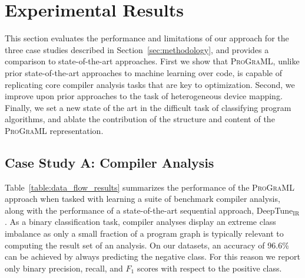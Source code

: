 \section{Experimental Results}

This section evaluates the performance and limitations of our approach
for the three case studies described in Section~\ref{sec:methodology},
and provides a comparison to state-of-the-art approaches. First we
show that \textsc{ProGraML}, unlike prior state-of-the-art approaches
to machine learning over code, is capable of replicating core compiler
analysis tasks that are key to optimization. Second, we improve upon
prior approaches to the task of heterogeneous device mapping. Finally,
we set a new state of the art in the difficult task of classifying
program algorithms, and ablate the contribution of the structure and
content of the \textsc{ProGraML} representation.


\subsection{Case Study A: Compiler Analysis}

Table~\ref{table:data_flow_results} summarizes the performance of the
\textsc{ProGraML} approach when tasked with learning a suite of
benchmark compiler analysis, along with the performance of a
state-of-the-art sequential approach, DeepTune$_\text{IR}$. As a
binary classification task, compiler analyses display an extreme class
imbalance as only a small fraction of a program graph is typically
relevant to computing the result set of an analysis. On our datasets,
an accuracy of 96.6\% can be achieved by always predicting the
negative class. For this reason we report only binary precision,
recall, and $F_1$ scores with respect to the positive class.

\begin{table}
  \centering%
  \vspace{.7em}
  \caption{%
    Benchmark compiler analyses results using two approaches: (a)
    DeepTune$_{\text{IR}}$, a sequential model adapted to work at the
    LLVM-IR level for statement-level classification, and (b)
    \textsc{ProGraML}, our approach. The relational representation
    significantly outperforms a sequential approach across all
    problems. For the Global Common Subexpressions analysis,
    DeepTune$_{\text{IR}}$ achieved a higher precision than
    \textsc{ProGraML} by predicting only the root statement as a
    component in a subexpression, avoiding false-positives.\\*
  }%
  \label{table:data_flow_results} %
\end{table}

